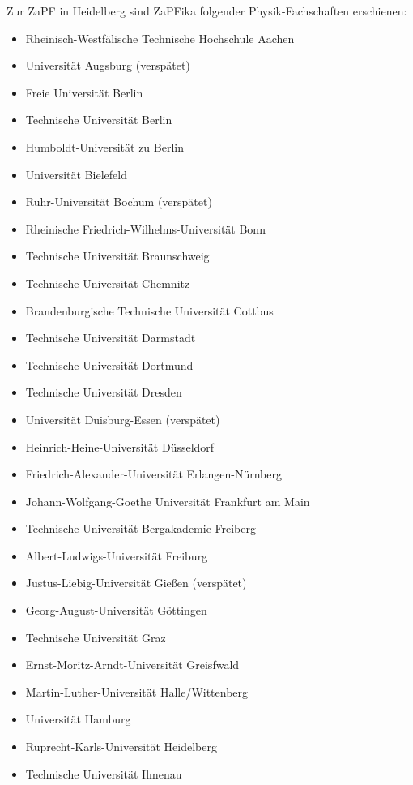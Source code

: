 \label{chap:anwesend}
  Zur ZaPF in Heidelberg sind ZaPFika folgender Physik-Fachschaften erschienen:
  \begin{itemize}
    \item Rheinisch-Westfälische Technische Hochschule Aachen
    \item Universität Augsburg (verspätet)
    \item Freie Universität Berlin
    \item Technische Universität Berlin
    \item Humboldt-Universität zu Berlin
    \item Universität Bielefeld
    \item Ruhr-Universität Bochum (verspätet)
    \item Rheinische Friedrich-Wilhelms-Universität Bonn
    \item Technische Universität Braunschweig
    \item Technische Universität Chemnitz
    \item Brandenburgische Technische Universität Cottbus
    \item Technische Universität Darmstadt
    \item Technische Universität Dortmund
    \item Technische Universität Dresden
    \item Universität Duisburg-Essen (verspätet)
    \item Heinrich-Heine-Universität Düsseldorf
    \item Friedrich-Alexander-Universität Erlangen-Nürnberg
    \item Johann-Wolfgang-Goethe Universität Frankfurt am Main
    \item Technische Universität Bergakademie Freiberg
    \item Albert-Ludwigs-Universität Freiburg
    \item Justus-Liebig-Universität Gießen (verspätet)
    \item Georg-August-Universität Göttingen
    \item Technische Universität Graz
    \item Ernst-Moritz-Arndt-Universität Greisfwald
    \item Martin-Luther-Universität Halle/Wittenberg
    \item Universität Hamburg
    \item Ruprecht-Karls-Universität Heidelberg
    \item Technische Universität Ilmenau

\end{itemize}
